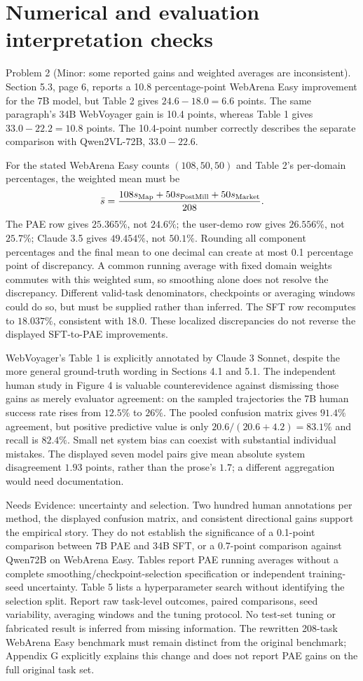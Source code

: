 \documentclass[10pt]{article}
\begin{document}
\section*{Numerical and evaluation interpretation checks}
Problem 2 (Minor: some reported gains and weighted averages are inconsistent).  Section 5.3, page 6, reports a 10.8 percentage-point WebArena Easy improvement for the 7B model, but Table 2 gives \(24.6-18.0=6.6\) points. The same paragraph’s 34B WebVoyager gain is 10.4 points, whereas Table 1 gives \(33.0-22.2=10.8\) points. The 10.4-point number correctly describes the separate comparison with Qwen2VL-72B, \(33.0-22.6\).\par
For the stated WebArena Easy counts \((108,50,50)\) and Table 2’s per-domain percentages, the weighted mean must be \[\bar s=\frac{108s_{\rm Map}+50s_{\rm PostMill}+50s_{\rm Market}}{208}.\] The PAE row gives \(25.365\%\), not \(24.6\%\); the user-demo row gives \(26.556\%\), not \(25.7\%\); Claude 3.5 gives \(49.454\%\), not \(50.1\%\). Rounding all component percentages and the final mean to one decimal can create at most 0.1 percentage point of discrepancy. A common running average with fixed domain weights commutes with this weighted sum, so smoothing alone does not resolve the discrepancy. Different valid-task denominators, checkpoints or averaging windows could do so, but must be supplied rather than inferred. The SFT row recomputes to \(18.037\%\), consistent with 18.0. These localized discrepancies do not reverse the displayed SFT-to-PAE improvements.\par
WebVoyager’s Table 1 is explicitly annotated by Claude 3 Sonnet, despite the more general ground-truth wording in Sections 4.1 and 5.1. The independent human study in Figure 4 is valuable counterevidence against dismissing those gains as merely evaluator agreement: on the sampled trajectories the 7B human success rate rises from \(12.5\%\) to \(26\%\). The pooled confusion matrix gives \(91.4\%\) agreement, but positive predictive value is only \(20.6/(20.6+4.2)=83.1\%\) and recall is \(82.4\%\). Small net system bias can coexist with substantial individual mistakes. The displayed seven model pairs give mean absolute system disagreement \(1.93\) points, rather than the prose’s \(1.7\); a different aggregation would need documentation.\par
Needs Evidence: uncertainty and selection. Two hundred human annotations per method, the displayed confusion matrix, and consistent directional gains support the empirical story. They do not establish the significance of a 0.1-point comparison between 7B PAE and 34B SFT, or a 0.7-point comparison against Qwen72B on WebArena Easy. Tables report PAE running averages without a complete smoothing/checkpoint-selection specification or independent training-seed uncertainty. Table 5 lists a hyperparameter search without identifying the selection split. Report raw task-level outcomes, paired comparisons, seed variability, averaging windows and the tuning protocol. No test-set tuning or fabricated result is inferred from missing information. The rewritten 208-task WebArena Easy benchmark must remain distinct from the original benchmark; Appendix G explicitly explains this change and does not report PAE gains on the full original task set.\par
\end{document}
